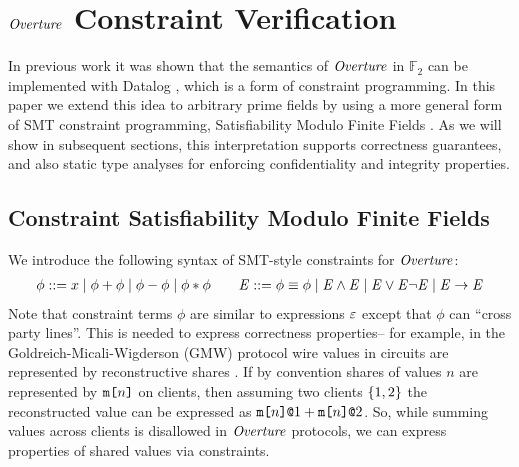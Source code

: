 \section{$\mathit{Overture}$ Constraint Verification}
\label{section-smt}

In previous work it was shown that the semantics of $\mathit{Overture}$ in
$\mathbb{F}_2$ can be implemented with Datalog
\cite{skalka-near-ppdp24}, which is a form of constraint
programming. In this paper we extend this idea to arbitrary prime
fields by using a more general form of SMT constraint programming,
Satisfiability Modulo Finite Fields \cite{SMFF}. As we
will show in subsequent sections, this interpretation supports
correctness guarantees, and also static type analyses for enforcing
confidentiality and integrity properties.

\subsection{Constraint Satisfiability Modulo Finite Fields}

We introduce the following syntax of SMT-style constraints
for $\mathit{Overture}$:
$$
\begin{array}{rcl}
  \phi ::= x \mid \phi + \phi \mid \phi - \phi \mid \phi * \phi  \qquad
  \mathit{E} ::= \phi \equiv \phi \mid \mathit{E} \wedge \mathit{E} \mid \mathit{E} \vee \mathit{E} \neg\mathit{E} \mid \mathit{E} \rightarrow \mathit{E}
\end{array}
$$
%
Note that constraint terms $\phi$ are similar to expressions $\varepsilon$
except that $\phi$ can ``cross party lines''. This is needed
to express correctness properties-- for example, in the
Goldreich-Micali-Wigderson (GMW) protocol wire values in circuits are
represented by reconstructive shares \cite{evans2018pragmatic}.  If by
convention shares of values $n$ are represented by $\texttt{m[}n\texttt{]}$ on
clients, then assuming two clients $\{ 1,2 \}$ the reconstructed
value can be expressed as $\texttt{m[}n\texttt{]}\texttt{@}1 + \texttt{m[}n\texttt{]}\texttt{@}2$.  So, while summing
values across clients is disallowed in $\mathit{Overture}$ protocols, we can
express properties of shared values via constraints.

%
%  
%  

